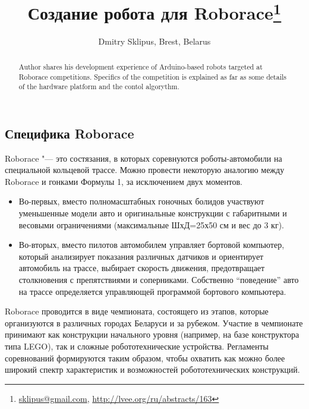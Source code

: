 \documentclass[10pt, a5paper]{article}
\begin{document}
\title{Создание робота для Roborace\footnote{\url{sklipus@gmail.com}, \url{http://lvee.org/ru/abstracts/163}}}
\author{Dmitry Sklipus, Brest, Belarus}
\maketitle
\begin{abstract}
Author shares his development experience of Arduino-based robots targeted at Roborace competitions. Specifics of the com\-petition is explained as far as some details of the hardware platform and the contol algorythm.
\end{abstract}
\subsection*{Специфика Roborace}

Roborace "--- это состязания, в которых соревнуются \linebreak роботы-автомобили на специальной кольцевой трассе. Можно провести некоторую аналогию между Roborace и гонками Формулы 1, за исключением двух моментов.

\begin{itemize}
  \item Во-первых, вместо полномасштабных гоночных болидов участвуют уменьшенные модели авто и оригинальные конструкции с габаритными и весовыми ограничениями (максимальные ШхД=25х50 см и вес до 3 кг).
  \item Во-вторых, вместо пилотов автомобилем управляет бортовой компьютер, который анализирует показания различных датчиков и ориентирует автомобиль на трассе, выбирает скорость движения, предотвращает столкновения с препятствиями и соперниками. Собственно “поведение” авто на трассе определяется управляющей программой бортового компьютера.
\end{itemize}

Roborace проводится в виде чемпионата, состоящего из этапов, которые организуются в различных городах Беларуси и за рубежом. Участие в чемпионате принимают как конструкции начального уровня (например, на базе конструктора типа LEGO), так и сложные робототехнические устройства. Регламенты соревнований формируются таким образом, чтобы охватить как можно более широкий спектр характеристик и возможностей робототехнических конструкций.
\end{document}
